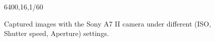 \begin{figure}[t!]
{\begin{minipage}[t]{0.32\textwidth}
{\footnotesize 6400,16,1/60}
\end{minipage}
}\vspace{-3mm}
    \caption{Captured images with the Sony A7 II camera under different (ISO, Shutter speed, Aperture) settings.}
    \label{fig6-1}
\end{figure}


\begin{figure}[t!]
    \centering
{}
\end{figure}
